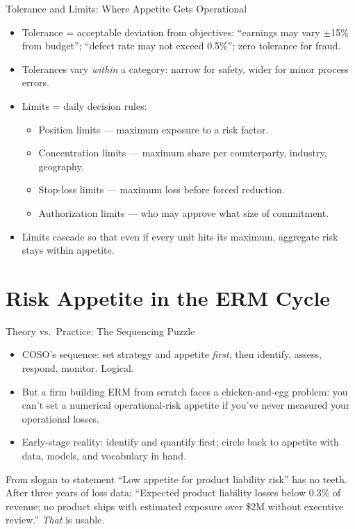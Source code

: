 \documentclass[11pt, aspectratio=169]{beamer}
\begin{document}
\begin{frame}{Tolerance and Limits: Where Appetite Gets Operational}
\begin{itemize}
  \item \alert{Tolerance} = acceptable deviation from objectives: ``earnings may vary $\pm$15\% from budget''; ``defect rate may not exceed 0.5\%''; zero tolerance for fraud.
  \item Tolerances vary \emph{within} a category: narrow for safety, wider for minor process errors.
  \item \alert{Limits} = daily decision rules:
  \begin{itemize}
    \item Position limits --- maximum exposure to a risk factor.
    \item Concentration limits --- maximum share per counterparty, industry, geography.
    \item Stop-loss limits --- maximum loss before forced reduction.
    \item Authorization limits --- who may approve what size of commitment.
  \end{itemize}
  \item Limits cascade so that even if every unit hits its maximum, aggregate risk stays within appetite.
\end{itemize}
\end{frame}

\section{Risk Appetite in the ERM Cycle}

\begin{frame}{Theory vs.\ Practice: The Sequencing Puzzle}
\begin{itemize}
  \item COSO's sequence: set strategy and appetite \emph{first}, then identify, assess, respond, monitor. Logical.
  \item But a firm building ERM from scratch faces a chicken-and-egg problem: you can't set a numerical operational-risk appetite if you've \alert{never measured your operational losses}.
  \item Early-stage reality: identify and quantify first; circle back to appetite with data, models, and vocabulary in hand.
\end{itemize}
\medskip
\begin{block}{From slogan to statement}
``Low appetite for product liability risk'' has no teeth. After three years of loss data: ``Expected product liability losses below 0.3\% of revenue; no product ships with estimated exposure over \$2M without executive review.'' \emph{That} is usable.
\end{block}
\end{frame}
\end{document}
